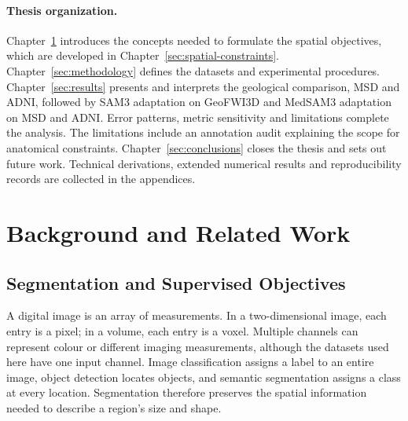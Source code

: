 \documentclass[12pt,a4paper]{article}
\begin{document}
\paragraph{Thesis organization.}\label{sec:organization}
Chapter~\ref{sec:background} introduces the concepts needed to formulate
the spatial objectives, which are developed in
Chapter~\ref{sec:spatial-constraints}. Chapter~\ref{sec:methodology}
defines the datasets and experimental procedures.
Chapter~\ref{sec:results} presents and interprets the geological comparison,
MSD and ADNI, followed by SAM3 adaptation on GeoFWI3D and MedSAM3
adaptation on MSD and ADNI. Error patterns, metric
sensitivity and limitations complete the analysis. The limitations include
an annotation audit explaining the scope for anatomical constraints.
Chapter~\ref{sec:conclusions} closes the thesis and sets out future work. Technical derivations, extended numerical results
and reproducibility records are collected in the appendices.

\clearpage
\section{Background and Related Work}\label{sec:background}

\subsection{Segmentation and Supervised Objectives}
\label{sec:volumetric-segmentation}\label{sec:segmentation-objectives}

A digital image is an array of measurements. In a two-dimensional image,
each entry is a pixel; in a volume, each entry is a voxel. Multiple
channels can represent colour or different imaging measurements, although
the datasets used here have one input channel. Image classification
assigns a label to an entire image, object detection locates objects,
and semantic segmentation assigns a class at every location. Segmentation
therefore preserves the spatial information needed to describe a region's
size and shape.
\end{document}
